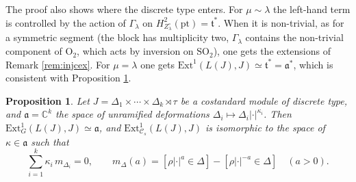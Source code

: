 \documentclass[a4paper,12pt,leqno]{amsart}
\theoremstyle{plain}
\newtheorem{prop}[thm]{Proposition}
\theoremstyle{definition}
\begin{document}
\noindent The proof also shows where the discrete type enters. For $\mu\sim\lambda$ the left-hand term
is controlled by the action of $\Gamma_\lambda$ on $H^2_{Z_\lambda^\circ}(\mathrm{pt})=\mathfrak{t}^*$. When it is non-trivial,
as for a symmetric segment (the block has multiplicity two, $\Gamma_\lambda$ contains the non-trivial component
of $\mathrm{O}_2$, which acts by inversion on $\mathrm{SO}_2$), one gets the extensions of Remark
\ref{rem:injcex}. For $\mu=\lambda$ one gets $\mathrm{Ext}^1(L(J),J)\simeq\mathfrak{t}^*=\mathfrak{a}^*$,
which is consistent with Proposition \ref{prop:selfext}.


\begin{prop}\label{prop:selfext} Let $J=\Delta_1\times\cdots\times\Delta_k\rtimes\tau$ be a costandard
module of discrete type, and $\mathfrak{a}=\mathbb{C}^k$ the space of unramified deformations
$\Delta_i\mapsto\Delta_i|\cdot|^{\kappa_i}$. Then $\mathrm{Ext}^1_G(L(J),J)\simeq\mathfrak{a}$, and
$\mathrm{Ext}^1_{\mathcal{C}_s}(L(J),J)$ is isomorphic to the space of $\kappa\in\mathfrak{a}$ such
that
\[\sum_{i=1}^k\kappa_i\,m_{\Delta_i}=0,\qquad m_\Delta(a)=[\rho|\cdot|^a\in\Delta]-
[\rho|\cdot|^{-a}\in\Delta]\quad(a>0).\]
\end{prop}
\end{document}
